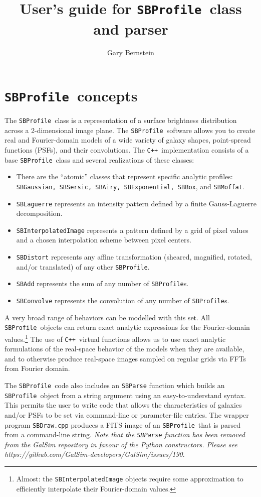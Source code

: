 \documentclass[11pt,preprint,flushrt]{aastex}
\begin{document}
\def\cpp{{\tt C++}}
\def\sbp{{\tt SBProfile}}
\def\sbph{{\tt SBProfile.h}}
\def\eqq#1{Equation~(\ref{#1})}

\title{User's guide for \sbp\ class and parser}
\author{Gary Bernstein}

\section{\sbp\ concepts}
The \sbp\ class is a representation of a surface brightness distribution across a 2-dimensional image plane.
The \sbp\ software allows you to create real and Fourier-domain models of a wide variety of galaxy shapes, point-spread functions (PSFs), and their convolutions.  The \cpp\ implementation consists of a base \sbp\ class and several realizations of these classes:
\begin{itemize}
\item There are the ``atomic'' classes that represent specific analytic profiles: {\tt SBGaussian, SBSersic, SBAiry, SBExponential, SBBox}, and {\tt SBMoffat}.
\item {\tt SBLaguerre} represents an intensity pattern defined by a finite Gauss-Laguerre decomposition.
\item {\tt SBInterpolatedImage} represents a pattern defined by a grid of pixel values and a chosen interpolation scheme between pixel centers.
\item {\tt SBDistort} represents any affine transformation (sheared, magnified, rotated, and/or translated) of any other \sbp.
\item {\tt SBAdd} represents the sum of any number of {\sbp}s.
\item {\tt SBConvolve} represents the convolution of any number of {\sbp}s.
\end{itemize}
A very broad range of behaviors can be modelled with this set.  All \sbp\ objects can return exact analytic expressions for the Fourier-domain values.\footnote{Almost: the {\tt SBInterpolatedImage} objects require some approximation to efficiently interpolate their Fourier-domain values.}  The use of \cpp\ virtual functions allows us to use exact analytic formulations of the real-space behavior of the models when they are available, and to otherwise produce real-space images sampled on regular grids via FFTs from Fourier domain.  

The \sbp\ code also includes an {\tt SBParse} function which builds an \sbp\ object from a string argument using an easy-to-understand syntax.  This permits the user to write code that allows the characteristics of galaxies and/or PSFs to be set via command-line or parameter-file entries.  The wrapper program {\tt SBDraw.cpp} produces a FITS image of an \sbp\ that is parsed from a command-line string.   \emph{Note that the {\tt SBParse} function has been removed from the GalSim repository in favour of the Python constructors.  Please see https://github.com/GalSim-developers/GalSim/issues/190}.
\end{document}
